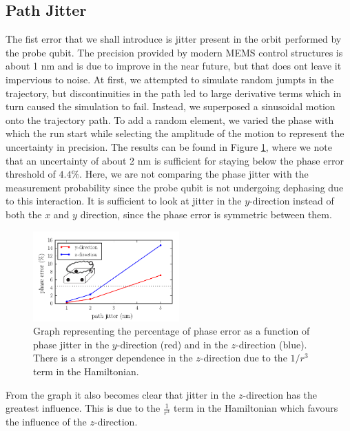 \subsection{Path Jitter}\label{sec:jitter}
The fist error that we shall introduce is jitter present in the orbit performed by the probe qubit. The precision provided by modern MEMS control structures is about 1 nm \cite{MEMS precision} and is due to improve in the near future, but that does ont leave it impervious to noise. At first, we attempted to simulate random jumpts in the trajectory, but discontinuities in the path led to large derivative terms which in turn caused the simulation to fail. Instead, we superposed a sinusoidal motion onto the trajectory path. To add a random element, we varied the phase with which the run start while selecting the amplitude of the motion to represent the uncertainty in precision. The results can be found in Figure \ref{fig:pathjitter}, where we note that an uncertainty of about 2 nm is sufficient for staying below the phase error threshold of $4.4 \%$. Here, we are not comparing the phase jitter with the measurement probability since the probe qubit is not undergoing dephasing due to this interaction. It is sufficient to look at jitter in the $y$-direction instead of both the $x$ and $y$ direction, since the phase error is symmetric between them. 



\begin{figure}[h]
  \centering
    \includegraphics[width=0.5\textwidth]{../Figures/path_jit.pdf}
      \caption{Graph representing the percentage of phase error as a function of phase jitter in the $y$-direction (red) and in the $z$-direction (blue). There is a stronger dependence in the $z$-direction due to the $1/r^3$ term in the Hamiltonian.}
      \label{fig:pathjitter}
\end{figure}


From the graph it also becomes clear that jitter in the $z$-direction has the greatest influence. This is due to the $\frac{1}{r^3}$  term in the Hamiltonian which favours the influence of the $z$-direction. 





